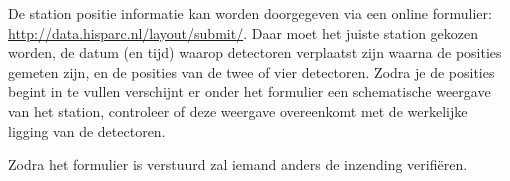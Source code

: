 De station positie informatie kan worden doorgegeven via een online
formulier: \url{http://data.hisparc.nl/layout/submit/}. Daar moet het
juiste station gekozen worden, de datum (en tijd) waarop detectoren
verplaatst zijn waarna de posities gemeten zijn, en de posities van de
twee of vier detectoren. Zodra je de posities begint in te vullen
verschijnt er onder het formulier een schematische weergave van het
station, controleer of deze weergave overeenkomt met de werkelijke
ligging van de detectoren.

Zodra het formulier is verstuurd zal iemand anders de inzending
verifiëren.


